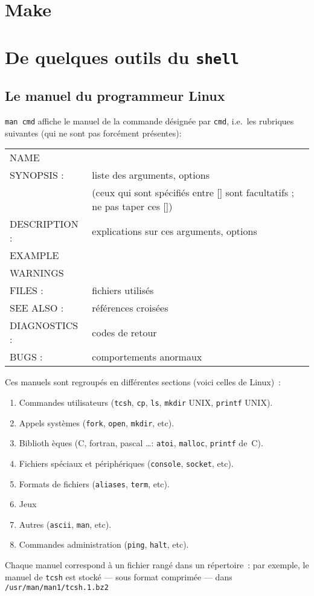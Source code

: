\section{Make}
\label{sec:Make}
\section{De quelques outils du \texttt{shell}}
\label{sec:OutilsDuShell}
\subsection{Le manuel du programmeur Linux}
\label{sec:man}
\verb?man cmd? affiche le manuel de la commande d\'esign\'ee par
\texttt{cmd}, i.e.\ les rubriques suivantes (qui ne sont pas
forc\'ement pr\'esentes):
\begin{center}
\begin{tabular}{ll}
NAME & \\ 
SYNOPSIS : & liste des arguments, options \\
           & (ceux qui sont sp\'ecifi\'es entre [] sont facultatifs ; ne pas taper ces []) \\
DESCRIPTION : & explications sur ces arguments, options \\
EXAMPLE & \\
WARNINGS & \\
FILES : & fichiers utilis\'es \\
SEE ALSO : & r\'ef\'erences crois\'ees \\
DIAGNOSTICS : & codes de retour \\
BUGS : & comportements anormaux
\end{tabular}
\end{center}
 Ces manuels sont regroup\'es en diff\'erentes sections (voici
celles de Linux)~:
\begin{enumerate}
\item Commandes utilisateurs (\texttt{tcsh}, \texttt{cp}, \texttt{ls},
  \texttt{mkdir} UNIX, \texttt{printf} UNIX).
\item Appels syst\`emes (\texttt{fork}, \texttt{open}, \texttt{mkdir}, etc).
\item  Biblioth
  \`eques (C, fortran, pascal \ldots : \texttt{atoi}, \texttt{malloc}, \texttt{printf} de~C).
\item Fichiers sp\'eciaux et p\'eriph\'eriques (\texttt{console},
  \texttt{socket}, etc).
\item Formats de fichiers (\texttt{aliases}, \texttt{term}, etc).
\item Jeux 
\item  Autres (\texttt{ascii}, \texttt{man}, etc).
\item Commandes administration (\texttt{ping}, \texttt{halt}, etc).
\end{enumerate}
Chaque manuel correspond \`a un fichier rang\'e dans un r\'epertoire~:
par exemple, le manuel de \texttt{tcsh} est stock\'e --- sous format
comprim\'ee --- dans \texttt{/usr/man/man1/tcsh.1.bz2}

